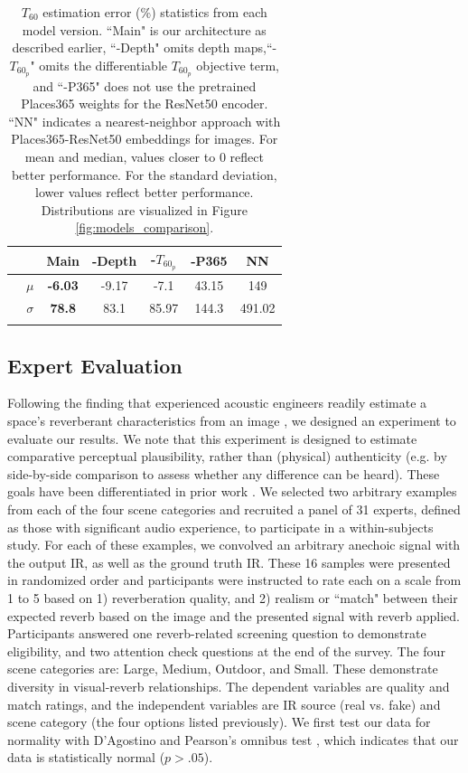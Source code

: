 \documentclass[10pt,twocolumn,letterpaper]{article}
\begin{document}
\begin{table}
    \small
    \centering
    \begin{tabular}{ccccccc}
        & & Main & -Depth & -${T_{60_p}}$ & -P365 & NN\\
        \hline
        & $\mu$ & \textbf{-6.03} & -9.17 & -7.1 & 43.15 & 149\\
        & $\sigma$ & \textbf{78.8} & 83.1 & 85.97 & 144.3 & 491.02\\\\
    \end{tabular}
    \caption{${T_{60}}$ estimation error (\%) statistics from each model version. ``Main" is our architecture as described earlier, ``-Depth" omits depth maps,``-${T_{60_p}}$" omits the differentiable ${T_{60_p}}$ objective term, and ``-P365" does not use the pretrained Places365 weights for the ResNet50 encoder. ``NN" indicates a nearest-neighbor approach with Places365-ResNet50 embeddings for images. For mean and median, values closer to 0 reflect better performance. For the standard deviation, lower values reflect better performance. Distributions are visualized in Figure \ref{fig:models_comparison}.}
    \label{tab:modelcomparison_metrics}
\end{table}

\subsection{Expert Evaluation}
Following the finding that experienced acoustic engineers readily estimate a space's reverberant characteristics from an image \cite{Kon2018}, we designed an experiment to evaluate our results. We note that this experiment is designed to estimate comparative perceptual plausibility, rather than (physical) authenticity (e.g. by side-by-side comparison to assess whether any difference can be heard). These goals have been differentiated in prior work \cite{pellegrini2001quality}. We selected two arbitrary examples from each of the four scene categories and recruited a panel of 31 experts, defined as those with significant audio experience, to participate in a within-subjects study. For each of these examples, we convolved an arbitrary anechoic signal with the output IR, as well as the ground truth IR. These 16 samples were presented in randomized order and participants were instructed to rate each on a scale from 1 to 5 based on 1) reverberation quality, and 2) realism or ``match" between their expected reverb based on the image and the presented signal with reverb applied. Participants answered one reverb-related screening question to demonstrate eligibility, and two attention check questions at the end of the survey. The four scene categories are: Large, Medium, Outdoor, and Small. These demonstrate diversity in visual-reverb relationships. The dependent variables are quality and match ratings, and the independent variables are IR source (real vs. fake) and scene category (the four options listed previously). We first test our data for normality with D'Agostino and Pearson's omnibus test \cite{pearson1977tests}, which indicates that our data is statistically normal ($p>.05$).
\end{document}
